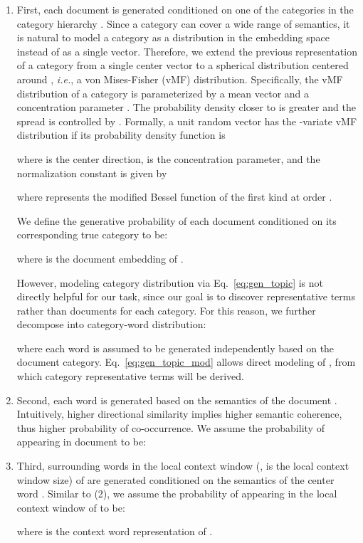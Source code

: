 \documentclass[sigconf]{acmart}
\newcommand{\ie}{\emph{i.e.}}
\theoremstyle{definition}
\begin{document}
\begin{enumerate}[wide, labelwidth=!, labelindent=0pt]
\item First, each document  is generated conditioned on one of the categories in the category hierarchy . 
Since a category can cover a wide range of semantics, it is natural to model a category as a distribution in the embedding space instead of as a single vector. Therefore, we extend the previous representation of a category  from a single center vector  to a spherical distribution centered around , \ie, a von Mises-Fisher (vMF) distribution. 
Specifically, the vMF distribution of a category is parameterized by a mean vector  and a concentration parameter . The probability density closer to  is greater and the spread is controlled by . Formally, a unit random vector  has the -variate vMF distribution  if its probability density function is

where  is the center direction,  is the concentration parameter, and the normalization constant  is given by

where  represents the modified Bessel function of the first kind at order . 

We define the generative probability of each document  conditioned on its corresponding true category  to be:

where  is the document embedding of .

However, modeling category distribution via Eq.~\eqref{eq:gen_topic} is not directly helpful for our task, since our goal is to discover representative terms rather than documents for each category. For this reason, we further decompose  into category-word distribution:

where each word is assumed to be generated independently based on the document category.
Eq.~\eqref{eq:gen_topic_mod} allows direct modeling of , from which category representative terms will be derived.

\item 
Second, each word  is generated based on the semantics of the document . Intuitively, higher directional similarity implies higher semantic coherence, thus higher probability of co-occurrence. We assume the probability of  appearing in document  to be:


\item
Third, surrounding words  in the local context window (,  is the local context window size) of  are generated conditioned on the semantics of the center word . Similar to (2), we assume the probability of  appearing in the local context window of  to be:

where  is the context word representation of .
\end{enumerate}
\end{document}
